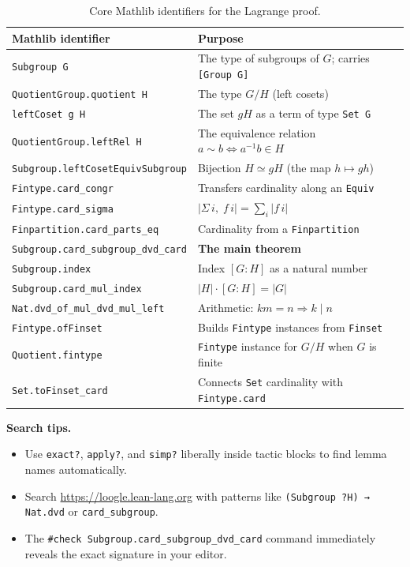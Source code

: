 \documentclass[11pt, a4paper]{article}
\theoremstyle{plain}
\theoremstyle{definition}
\newcommand{\abs}[1]{\lvert #1 \rvert}
\newcommand{\divides}{\mid}
\newcommand{\lean}[1]{\texttt{\color{lean-blue}#1}}
\begin{document}
\begin{table}[ht]
\centering
\renewcommand{\arraystretch}{1.35}
\begin{tabular}{@{}p{5.8cm}p{8.5cm}@{}}
\toprule
\textbf{Mathlib identifier} & \textbf{Purpose} \\
\midrule
\lean{Subgroup G}                        & The type of subgroups of $G$; carries \lean{[Group G]} \\
\lean{QuotientGroup.quotient H}          & The type $G/H$ (left cosets) \\
\lean{leftCoset g H}                     & The set $gH$ as a term of type \lean{Set G} \\
\lean{QuotientGroup.leftRel H}           & The equivalence relation $a \sim b \iff a^{-1}b \in H$ \\
\lean{Subgroup.leftCosetEquivSubgroup}   & Bijection $H \simeq gH$ (the map $h \mapsto gh$) \\
\lean{Fintype.card\_congr}               & Transfers cardinality along an \lean{Equiv} \\
\lean{Fintype.card\_sigma}               & $\abs{\Sigma\, i,\; f\, i} = \sum_i \abs{f\, i}$ \\
\lean{Finpartition.card\_parts\_eq}      & Cardinality from a \lean{Finpartition} \\
\lean{Subgroup.card\_subgroup\_dvd\_card} & \textbf{The main theorem} \\
\lean{Subgroup.index}                    & Index $[G:H]$ as a natural number \\
\lean{Subgroup.card\_mul\_index}         & $\abs{H} \cdot [G:H] = \abs{G}$ \\
\lean{Nat.dvd\_of\_mul\_dvd\_mul\_left} & Arithmetic: $km = n \Rightarrow k \divides n$ \\
\lean{Fintype.ofFinset}                  & Builds \lean{Fintype} instances from \lean{Finset} \\
\lean{Quotient.fintype}                  & \lean{Fintype} instance for $G/H$ when $G$ is finite \\
\lean{Set.toFinset\_card}               & Connects \lean{Set} cardinality with \lean{Fintype.card} \\
\bottomrule
\end{tabular}
\caption{Core Mathlib identifiers for the Lagrange proof.}
\label{tab:mathlib}
\end{table}

\begin{notebox}
\textbf{Search tips.}
\begin{itemize}[nosep]
  \item Use \texttt{exact?}, \texttt{apply?}, and \texttt{simp?} liberally
        inside tactic blocks to find lemma names automatically.
  \item Search \url{https://loogle.lean-lang.org} with patterns like
        \verb|(Subgroup ?H) → Nat.dvd| or
        \verb|card_subgroup|.
  \item The \texttt{\#check Subgroup.card\_subgroup\_dvd\_card} command
        immediately reveals the exact signature in your editor.
\end{itemize}
\end{notebox}
\end{document}
